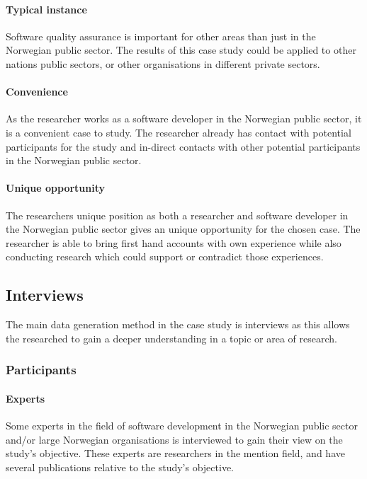 \paragraph{Typical instance}
Software quality assurance is important for other areas than just in the Norwegian public sector. The results of this case study could be applied to other nations public sectors, or other organisations in different private sectors.

\paragraph{Convenience}
As the researcher works as a software developer in the Norwegian public sector, it is a convenient case to study. The researcher already has contact with potential participants for the study and in-direct contacts with other potential participants in the Norwegian public sector.

\paragraph{Unique opportunity}
The researchers unique position as both a researcher and software developer in the Norwegian public sector gives an unique opportunity for the chosen case. The researcher is able to bring first hand accounts with own experience while also conducting research which could support or contradict those experiences.

\subsection{Interviews}
The main data generation method in the case study is interviews as this allows the researched to gain a deeper understanding in a topic or area of research.

\subsubsection{Participants}

\paragraph{Experts}
Some experts in the field of software development in the Norwegian public sector and/or large Norwegian organisations is interviewed to gain their view on the study's objective. These experts are researchers in the mention field, and have several publications relative to the study's objective.

